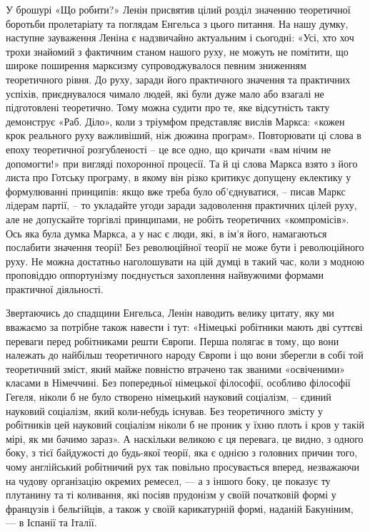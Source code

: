 \documentclass[../main]{subfiles}
\begin{document}
У брошурі «Що робити?» Ленін присвятив цілий розділ значенню теоретичної боротьби пролетаріату та поглядам Енгельса з цього питання. На нашу думку, наступне зауваження Леніна є надзвичайно актуальним і сьогодні: «Усі, хто хоч трохи знайомий з фактичним станом нашого руху, не можуть не помітити, що широке поширення марксизму супроводжувалося певним зниженням теоретичного рівня. До руху, заради його практичного значення та практичних успіхів, приєднувалося чимало людей, які були дуже мало або взагалі не підготовлені теоретично. Тому можна судити про те, яке відсутність такту демонструє «Раб. Діло», коли з тріумфом представляє вислів Маркса: «кожен крок реального руху важливіший, ніж дюжина програм». Повторювати ці слова в епоху теоретичної розгубленості – це все одно, що кричати «вам нічим не допомогти!» при вигляді похоронної процесії. Та й ці слова Маркса взято з його листа про Готську програму, в якому він різко критикує допущену еклектику у формулюванні принципів: якщо вже треба було об’єднуватися, – писав Маркс лідерам партії, – то укладайте угоди заради задоволення практичних цілей руху, але не допускайте торгівлі принципами, не робіть теоретичних «компромісів». Ось яка була думка Маркса, а у нас є люди, які, в ім’я його, намагаються послабити значення теорії! Без революційної теорії не може бути і революційного руху. Не можна достатньо наголошувати на цій думці в такий час, коли з модною проповіддю оппортунізму поєднується захоплення найвужчими формами практичної діяльності.

Звертаючись до спадщини Енгельса, Ленін наводить велику цитату, яку ми вважаємо за потрібне також навести і тут: «Німецькі робітники мають дві суттєві переваги перед робітниками решти Європи. Перша полягає в тому, що вони належать до найбільш теоретичного народу Європи і що вони зберегли в собі той теоретичний зміст, який майже повністю втрачено так званими «освіченими» класами в Німеччині. Без попередньої німецької філософії, особливо філософії Гегеля, ніколи б не було створено німецький науковий соціалізм, – єдиний науковий соціалізм, який коли-небудь існував. Без теоретичного змісту у робітників цей науковий соціалізм ніколи б не проник у їхню плоть і кров у такій мірі, як ми бачимо зараз». А наскільки великою є ця перевага, це видно, з одного боку, з тієї байдужості до будь-якої теорії, яка є однією з головних причин того, чому англійський робітничий рух так повільно просувається вперед, незважаючи на чудову організацію окремих ремесел, — а з іншого боку, це показує ту плутанину та ті коливання, які посіяв прудонізм у своїй початковій формі у французів і бельгійців, а також у своїй карикатурній формі, наданій Бакуніним, — в Іспанії та Італії.
\end{document}
